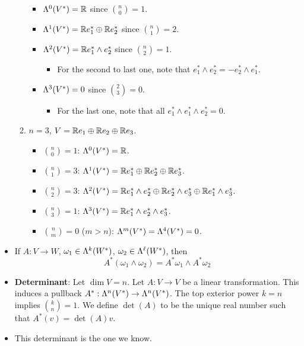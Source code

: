 \documentclass[../notes.tex]{subfiles}
\begin{document}
\begin{itemize}
\begin{enumerate}
\begin{itemize}
            \item $\lam[0]{V^*}=\R$ since $\binom{n}{0}=1$.
            \item $\lam[1]{V^*}=\R e_1^*\oplus\R e_2^*$ since $\binom{n}{1}=2$.
            \item $\lam[2]{V^*}=\R e_1^*\wedge e_2^*$ since $\binom{n}{2}=1$.
            \begin{itemize}
                \item For the second to last one, note that $e_1^*\wedge e_2^*=-e_2^*\wedge e_1^*$.
            \end{itemize}
            \item $\lam[3]{V^*}=0$ since $\binom{2}{3}=0$.
            \begin{itemize}
                \item For the last one, note that all $e_1^*\wedge e_1^*\wedge e_2^*=0$.
            \end{itemize}
        \end{itemize}
        \item $n=3$, $V=\R e_1\oplus\R e_2\oplus\R e_3$.
        \begin{itemize}
            \item $\binom{n}{0}=1$: $\lam[0]{V^*}=\R$.
            \item $\binom{n}{1}=3$: $\lam[1]{V^*}=\R e_1^*\oplus\R e_2^*\oplus\R e_3^*$.
            \item $\binom{n}{2}=3$: $\lam[2]{V^*}=\R e_1^*\wedge e_2^*\oplus\R e_2^*\wedge e_3^*\oplus\R e_1^*\wedge e_3^*$.
            \item $\binom{n}{3}=1$: $\lam[3]{V^*}=\R e_1^*\wedge e_2^*\wedge e_3^*$.
            \item $\binom{n}{m}=0$ ($m>n$): $\lam[m]{V^*}=\lam[4]{V^*}=0$.
        \end{itemize}
    \end{enumerate}
    \item If $A:V\to W$, $\omega_1\in\lam[k]{W^*}$, $\omega_2\in\lam[\ell]{W^*}$, then
    \begin{equation*}
        A^*(\omega_1\wedge\omega_2) = A^*\omega_1\wedge A^*\omega_2
    \end{equation*}
    \item \textbf{Determinant}: Let $\dim V=n$. Let $A:V\to V$ be a linear transformation. This induces a pullback $A^*:\lam[n]{V^*}\to\lam[n]{V^*}$. The top exterior power $k=n$ implies $\binom{k}{n}=1$. We define $\det(A)$ to be the unique real number such that $A^*(v)=\det(A)v$.
    \item This determinant is the one we know.

\end{itemize}
\end{document}
